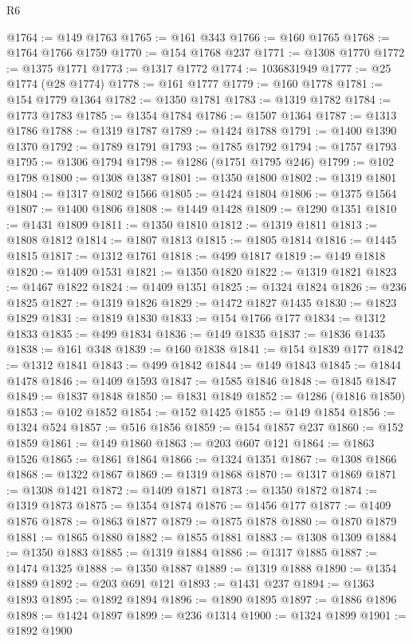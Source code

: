 \begin{lexlean}{R6}
\begin{coremodule}
@1764 := @149 @1763
@1765 := @161 @343
@1766 := @160 @1765
@1768 := @1764 @1766 @1759
@1770 := @154 @1768 @237
@1771 := @1308 @1770
@1772 := @1375 @1771
@1773 := @1317 @1772
@1774 := 1036831949
@1777 := @25 @1774 (@28 @1774)
@1778 := @161 @1777
@1779 := @160 @1778
@1781 := @154 @1779 @1364
@1782 := @1350 @1781
@1783 := @1319 @1782
@1784 := @1773 @1783
@1785 := @1354 @1784
@1786 := @1507 @1364
@1787 := @1313 @1786
@1788 := @1319 @1787
@1789 := @1424 @1788
@1791 := @1400 @1390 @1370
@1792 := @1789 @1791
@1793 := @1785 @1792
@1794 := @1757 @1793
@1795 := @1306 @1794
@1798 := @1286 (@1751 @1795 @246)
@1799 := @102 @1798
@1800 := @1308 @1387
@1801 := @1350 @1800
@1802 := @1319 @1801
@1804 := @1317 @1802 @1566
@1805 := @1424 @1804
@1806 := @1375 @1564
@1807 := @1400 @1806
@1808 := @1449 @1428
@1809 := @1290 @1351
@1810 := @1431 @1809
@1811 := @1350 @1810
@1812 := @1319 @1811
@1813 := @1808 @1812
@1814 := @1807 @1813
@1815 := @1805 @1814
@1816 := @1445 @1815
@1817 := @1312 @1761
@1818 := @499 @1817
@1819 := @149 @1818
@1820 := @1409 @1531
@1821 := @1350 @1820
@1822 := @1319 @1821
@1823 := @1467 @1822
@1824 := @1409 @1351
@1825 := @1324 @1824
@1826 := @236 @1825
@1827 := @1319 @1826
@1829 := @1472 @1827 @1435
@1830 := @1823 @1829
@1831 := @1819 @1830
@1833 := @154 @1766 @177
@1834 := @1312 @1833
@1835 := @499 @1834
@1836 := @149 @1835
@1837 := @1836 @1435
@1838 := @161 @348
@1839 := @160 @1838
@1841 := @154 @1839 @177
@1842 := @1312 @1841
@1843 := @499 @1842
@1844 := @149 @1843
@1845 := @1844 @1478
@1846 := @1409 @1593
@1847 := @1585 @1846
@1848 := @1845 @1847
@1849 := @1837 @1848
@1850 := @1831 @1849
@1852 := @1286 (@1816 @1850)
@1853 := @102 @1852
@1854 := @152 @1425
@1855 := @149 @1854
@1856 := @1324 @524
@1857 := @516 @1856
@1859 := @154 @1857 @237
@1860 := @152 @1859
@1861 := @149 @1860
@1863 := @203 @607 @121
@1864 := @1863 @1526
@1865 := @1861 @1864
@1866 := @1324 @1351
@1867 := @1308 @1866
@1868 := @1322 @1867
@1869 := @1319 @1868
@1870 := @1317 @1869
@1871 := @1308 @1421
@1872 := @1409 @1871
@1873 := @1350 @1872
@1874 := @1319 @1873
@1875 := @1354 @1874
@1876 := @1456 @177
@1877 := @1409 @1876
@1878 := @1863 @1877
@1879 := @1875 @1878
@1880 := @1870 @1879
@1881 := @1865 @1880
@1882 := @1855 @1881
@1883 := @1308 @1309
@1884 := @1350 @1883
@1885 := @1319 @1884
@1886 := @1317 @1885
@1887 := @1474 @1325
@1888 := @1350 @1887
@1889 := @1319 @1888
@1890 := @1354 @1889
@1892 := @203 @691 @121
@1893 := @1431 @237
@1894 := @1363 @1893
@1895 := @1892 @1894
@1896 := @1890 @1895
@1897 := @1886 @1896
@1898 := @1424 @1897
@1899 := @236 @1314
@1900 := @1324 @1899
@1901 := @1892 @1900

\end{coremodule}
\end{lexlean}
